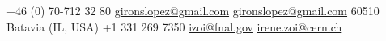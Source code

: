 \ifswedish
  
    {+46 (0) 70-712 32 80}
    {\href{mailto:gironslopez@gmail.com}{gironslopez@gmail.com}}  {\href{mailto:gironslopez@gmail.com}{gironslopez@gmail.com}}
\else
   {60510 Batavia (IL, USA)} 
  {+1 331 269 7350} {}
  {\href{mailto:izoi@fnal.gov}{izoi@fnal.gov}} {\href{mailto:irene.zoi@cern.ch}{irene.zoi@cern.ch}}
\fi
